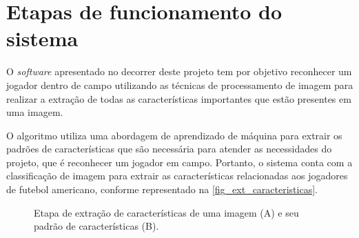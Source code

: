 \section{\textbf{Etapas de funcionamento do sistema}}
\label{descricao-do-sistema}


O \textit{software} apresentado no decorrer deste projeto tem por objetivo reconhecer um jogador dentro de campo utilizando as técnicas de processamento de imagem para realizar a extração de todas as características importantes que estão presentes em uma imagem.

O algoritmo utiliza uma abordagem de aprendizado de máquina para extrair os padrões de características que são necessária para atender as necessidades do projeto, que é reconhecer um jogador em campo. Portanto, o sistema conta com a classificação de imagem para extrair as características relacionadas aos jogadores de futebol americano, conforme representado na \autoref{fig_ext_caracteristicas}.

\begin{figure}[h]
	\caption{\label{fig_ext_caracteristicas}Etapa de extração de características de uma imagem (A) e seu padrão de características (B).}
	\begin{center}
	\end{center}
	\centering {}
\end{figure}


